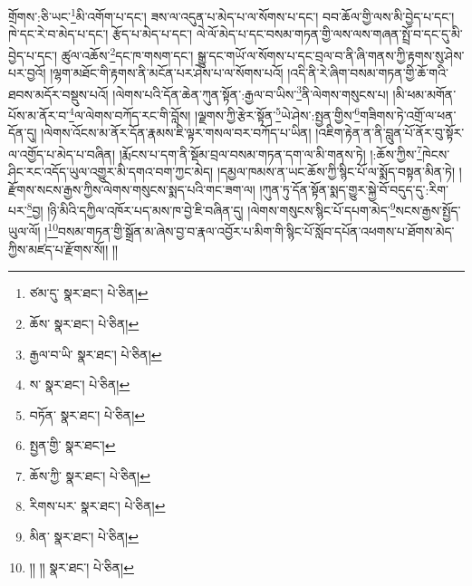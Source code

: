 གྲོགས་:ཅི་ཡང་\footnote{ཙམ་དུ་  སྣར་ཐང་།  པེ་ཅིན། }མི་འགོག་པ་དང་། ཟས་ལ་འདུན་པ་མེད་པ་ལ་སོགས་པ་དང་། བབ་ཆོལ་གྱི་ལས་མི་བྱེད་པ་དང་། ཁེ་དང་རེ་བ་མེད་པ་དང་། རྩོད་པ་མེད་པ་དང་། ལེ་ལོ་མེད་པ་དང་བསམ་གཏན་གྱི་ལས་ལས་གཞན་སྤྲོ་བ་དང་དུ་མི་བྱེད་པ་དང་། ཚུལ་འཆོས་\footnote{ཆོས་  སྣར་ཐང་།  པེ་ཅིན། }དང་ཁ་གསག་དང་། སྒྱུ་དང་གཡོ་ལ་སོགས་པ་དང་བྲལ་བ་ནི་ཞི་གནས་ཀྱི་རྟགས་སུ་ཤེས་པར་བྱའོ། །ལྷག་མཐོང་གི་རྟགས་ནི་མངོན་པར་ཤེས་པ་ལ་སོགས་པའོ། །འདི་ནི་རེ་ཞིག་བསམ་གཏན་གྱི་ཆོ་གའི་ཐབས་མདོར་བསྡུས་པའོ། །ལེགས་པའི་དོན་ཆེན་ཀུན་སྟོན་:རྒྱལ་བ་ཡིས་\footnote{རྒྱལ་བ་ཡི་  སྣར་ཐང་།  པེ་ཅིན། }ནི་ལེགས་གསུངས་པ། །མི་ཕམ་མགོན་པོས་མ་ནོར་བ་\footnote{ས་  སྣར་ཐང་།  པེ་ཅིན། }ལ་ལེགས་བཀོད་རང་གི་བློས། །ལྗགས་ཀྱི་རྩེར་སྟོན་\footnote{བཏོན་  སྣར་ཐང་།  པེ་ཅིན། }ཡེ་ཤེས་:སྤྱན་གྱིས་\footnote{སྤྱན་གྱི་  སྣར་ཐང་། }གཟིགས་ཏེ་འགྲོ་ལ་ཕན་དོན་དུ། །ལེགས་འོངས་མ་ནོར་དོན་རྣམས་ཇི་ལྟར་གསལ་བར་བཀོད་པ་ཡིན། །འཇིག་རྟེན་ན་ནི་བླུན་པོ་ནོར་བུ་སྟོར་ལ་འགྱོད་པ་མེད་པ་བཞིན། །རྨོངས་པ་དག་ནི་སྡོམ་བྲལ་བསམ་གཏན་དག་ལ་མི་གནས་ཏེ། །:ཆོས་ཀྱིས་\footnote{ཆོས་ཀྱི་  སྣར་ཐང་།  པེ་ཅིན། }ཁེངས་ཤིང་རང་འདོད་ཡུལ་འགྱུར་མི་དགའ་བག་ཀྱང་མེད། །དམྱལ་ཁམས་ན་ཡང་ཆོས་ཀྱི་སྙིང་པོ་ལ་སྨོད་བསྟན་མིན་ཏེ། །རྫོགས་སངས་རྒྱས་ཀྱིས་ལེགས་གསུངས་སྨད་པའི་གང་ཟག་ལ། །ཀུན་ཏུ་དོན་སྟོན་སྨད་གྱུར་སྐྱེ་བོ་བདུད་དུ་:རིག་པར་\footnote{རིགས་པར་  སྣར་ཐང་།  པེ་ཅིན། }བྱ། །ཉི་མིའི་དཀྱིལ་འཁོར་པད་མས་ཁ་བྱེ་ཇི་བཞིན་དུ། །ལེགས་གསུངས་སྙིང་པོ་དཔག་མེད་\footnote{མིན་  སྣར་ཐང་།  པེ་ཅིན། }སངས་རྒྱས་སྤྱོད་ཡུལ་ལོ། །\footnote{།། །།  སྣར་ཐང་།  པེ་ཅིན། }བསམ་གཏན་གྱི་སྒྲོན་མ་ཞེས་བྱ་བ་རྣལ་འབྱོར་པ་མིག་གི་སྙིང་པོ་སློབ་དཔོན་འཕགས་པ་ཐོགས་མེད་ཀྱིས་མཛད་པ་རྫོགས་སོ།། །།